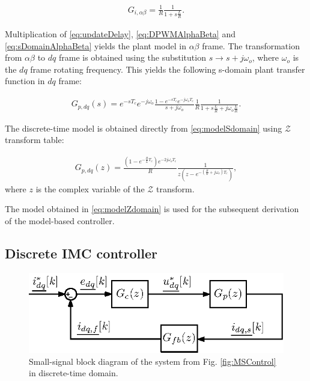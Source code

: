 \documentclass[journal]{IEEEtran}
\begin{document}
\begin{equation}
\begin{aligned}
G_{i,\alpha \beta} = \frac{1}{R} \frac{1}{1 + s \frac{L}{R}}.
\label{eq:sDomainAlphaBeta} 
\end{aligned}    
\end{equation}


Multiplication of \eqref{eq:updateDelay}, \eqref{eq:DPWMAlphaBeta} and \eqref{eq:sDomainAlphaBeta} yields the plant model in $\alpha \beta$ frame.
The transformation from $\alpha \beta$ to $dq$ frame is obtained using the substitution $s \rightarrow s + j \omega_o$, where $\omega_o$ is the $dq$ frame rotating frequency.
This yields the following s-domain plant transfer function in $dq$ frame:

\begin{equation}
\begin{aligned}
G_{p,dq}(s) = e^{-s T_c} e^{-j\omega_o} \frac{1-e^{-sT_c}e^{-j\omega_oT_c}}{s+j\omega_o} \frac{1}{R} \frac{1}{1 + s \frac{L}{R} + j\omega_o \frac{L}{R}}.
\label{eq:modelSdomain} 
\end{aligned}    
\end{equation}
 
The discrete-time model is obtained directly from \eqref{eq:modelSdomain} using $\mathcal{Z}$ transform table:

\begin{equation}
\begin{aligned}
G_{p,dq}(z) = \frac{\left( 1 - e^{-\frac{R}{L}T_c}\right) e^{-2j\omega_o T_c}}{R} \frac{1}{z \left( z - e^{- \left( \frac{R}{L} + j\omega_o\right) T_c}\right)},
\label{eq:modelZdomain} 
\end{aligned}    
\end{equation}
where $z$ is the complex variable of the $\mathcal{Z}$ transform.

The model obtained in \ref{eq:modelZdomain} is used for the subsequent derivation of the model-based controller.
 
\subsection{Discrete IMC controller}


\begin{figure}[t!]
    \centerline{\includegraphics[width=0.95\linewidth]{figures/small_signal.eps}}
    \caption{Small-signal block diagram of the system from Fig. \ref{fig:MSControl} in discrete-time domain.}
    \label{fig:SmallSignal}
\end{figure}
\end{document}
